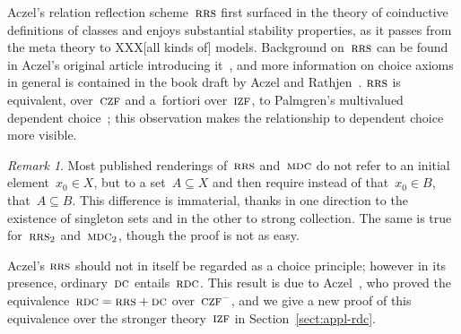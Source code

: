 \documentclass[oneside,reqno]{amsart}
\theoremstyle{definition}
\theoremstyle{plain}
\theoremstyle{remark}
\newtheorem{rem}[defn]{Remark}
\renewcommand{\_}{\mathpunct{.}\,}
\newcommand{\?}{\,{:}\,}
\newcommand{\IZF}{\textsc{izf}}
\newcommand{\CZF}{\textsc{czf}}
\newcommand{\RRS}{\textsc{rrs}}
\newcommand{\RDC}{\textsc{rdc}}
\newcommand{\DC}{\textsc{dc}}
\newcommand{\MDC}{\textsc{mdc}}
\begin{document}
Aczel's relation reflection scheme~$\RRS$ first surfaced in
the theory of coinductive definitions of classes and enjoys substantial
stability properties, as it passes from the meta theory to XXX[all kinds of]
models. Background on~$\RRS$ can be found in Aczel's original article
introducing it~\cite{aczel:rrs}, and more information on choice axioms in
general is contained in the book draft by Aczel and
Rathjen~\cite[Section~10]{aczel-rathjen:cst}.
$\RRS$ is equivalent, over~$\CZF$ and
a~fortiori over~$\IZF$, to Palmgren's multivalued dependent
choice~\cite{palmgren:mdc}; this observation makes the relationship to
dependent choice more visible.

\begin{rem}Most published renderings of~$\RRS$ and~$\MDC$ do not refer to an initial
element~$x_0 \in X$, but to a set~$A \subseteq X$ and then require instead
of that~$x_0 \in B$, that~$A \subseteq B$. This difference is immaterial, thanks in
one direction to the existence of singleton sets and in the other to strong
collection. The same is true for~$\RRS_2$ and~$\MDC_2$, though the proof is not
as easy.
\end{rem}


%
%
%
%
%

Aczel's $\RRS$ should not in itself be regarded as a choice principle; however in
its presence, ordinary~$\DC$ entails~$\RDC$. This result is due to
Aczel~\cite[Theorem~2.4]{aczel:rrs}, who proved the equivalence~$\RDC = \RRS +
\DC$ over~$\CZF^-$, and we give a new proof of this equivalence over the
stronger theory~$\IZF$ in Section~\ref{sect:appl-rdc}.
\end{document}
